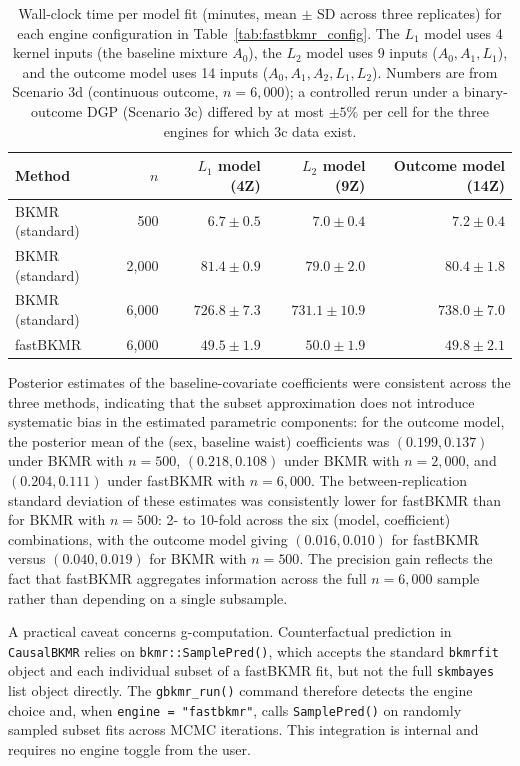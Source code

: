 \documentclass[11pt]{article}
\newcommand{\pkg}[1]{\texttt{#1}}
\newcommand{\code}[1]{\texttt{#1}}
\begin{document}
\begin{table}[h]
\centering
\caption{Wall-clock time per model fit (minutes, mean $\pm$ SD across three replicates) for each engine configuration in Table~\ref{tab:fastbkmr_config}. The $L_1$ model uses 4 kernel inputs (the baseline mixture $A_0$), the $L_2$ model uses 9 inputs ($A_0, A_1, L_1$), and the outcome model uses 14 inputs ($A_0, A_1, A_2, L_1, L_2$). Numbers are from Scenario 3d (continuous outcome, $n = 6{,}000$); a controlled rerun under a binary-outcome DGP (Scenario 3c) differed by at most $\pm 5\%$ per cell for the three engines for which 3c data exist.}
\label{tab:fastbkmr_time}
\begin{tabular}{lr rrr}
\toprule
Method & $n$ & $L_1$ model (4Z) & $L_2$ model (9Z) & Outcome model (14Z) \\
\midrule
BKMR (standard)    &     500 & $6.7 \pm 0.5$    & $7.0 \pm 0.4$     & $7.2 \pm 0.4$   \\
BKMR (standard)    & 2{,}000 & $81.4 \pm 0.9$   & $79.0 \pm 2.0$    & $80.4 \pm 1.8$  \\
BKMR (standard)    & 6{,}000 & $726.8 \pm 7.3$  & $731.1 \pm 10.9$  & $738.0 \pm 7.0$ \\
fastBKMR           & 6{,}000 & $49.5 \pm 1.9$   & $50.0 \pm 1.9$    & $49.8 \pm 2.1$  \\
\bottomrule
\end{tabular}
\end{table}

Posterior estimates of the baseline-covariate coefficients were consistent across the three methods, indicating that the subset approximation does not introduce systematic bias in the estimated parametric components: for the outcome model, the posterior mean of the (sex, baseline waist) coefficients was $(0.199, 0.137)$ under BKMR with $n = 500$, $(0.218, 0.108)$ under BKMR with $n = 2{,}000$, and $(0.204, 0.111)$ under fastBKMR with $n = 6{,}000$. The between-replication standard deviation of these estimates was consistently lower for fastBKMR than for BKMR with $n = 500$: 2- to 10-fold across the six (model, coefficient) combinations, with the outcome model giving $(0.016, 0.010)$ for fastBKMR versus $(0.040, 0.019)$ for BKMR with $n = 500$. The precision gain reflects the fact that fastBKMR aggregates information across the full $n = 6{,}000$ sample rather than depending on a single subsample.

A practical caveat concerns g-computation. Counterfactual prediction in \pkg{CausalBKMR} relies on \code{bkmr::SamplePred()}, which accepts the standard \code{bkmrfit} object and each individual subset of a fastBKMR fit, but not the full \code{skmbayes} list object directly. The \code{gbkmr\_run()} command therefore detects the engine choice and, when \code{engine = "fastbkmr"}, calls \code{SamplePred()} on randomly sampled subset fits across MCMC iterations. This integration is internal and requires no engine toggle from the user.
\end{document}
